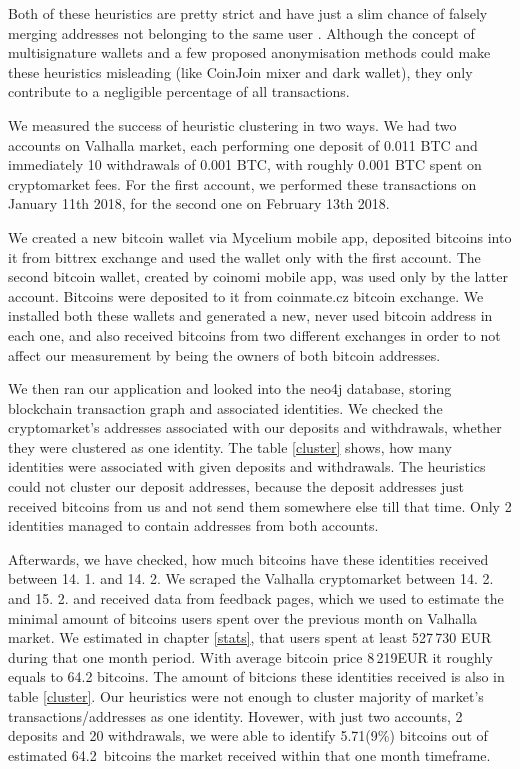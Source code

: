\documentclass[
  digital, %
  table,   %
  lof,     %
  lot,     %
  oneside
]{fithesis3}
\begin{document}
Both of these heuristics are pretty strict and have just a slim chance of falsely merging
addresses not belonging to the same user \parencite{androulaki2013evaluating}.
Although the concept of multisignature wallets and a few proposed anonymisation methods could make
these heuristics misleading (like CoinJoin mixer and dark wallet), they only contribute to a 
negligible percentage of all transactions.

We measured the success of heuristic clustering in two ways.
We had two accounts on Valhalla market, each performing one deposit of 0.011 BTC and immediately 10 withdrawals of
0.001 BTC, with roughly 0.001 BTC spent on cryptomarket fees.
For the first account, we performed these transactions on January 11th 2018, for the second one on February 13th 2018.

We created a new bitcoin wallet via Mycelium mobile app, deposited bitcoins into it
from bittrex exchange and used the wallet only with the first account.
The second bitcoin wallet, created by coinomi mobile app, was used only by the latter account. 
Bitcoins were deposited to it from coinmate.cz bitcoin exchange.
We installed both these wallets and generated a new, never used bitcoin address in each one, and also
received bitcoins from two different exchanges in order to not affect
our measurement by being the owners of both bitcoin addresses.

We then ran our application and looked into the neo4j database, storing
blockchain transaction graph and associated identities.
We checked the cryptomarket's addresses associated with our deposits and withdrawals,
whether they were clustered as one identity. The table \ref{cluster} shows, how many identities
were associated with given deposits and withdrawals. The heuristics could not cluster our
deposit addresses, because the deposit addresses just received bitcoins from us and not send them
somewhere else till that time. Only 2 identities managed to contain addresses from both accounts.

Afterwards, we have checked, how much bitcoins have these
identities received between 14. 1. and 14. 2. We scraped the Valhalla cryptomarket between 14. 2. and 15. 2.
and received data from feedback pages, which we used to estimate 
the minimal amount of bitcoins users spent over the previous month on Valhalla market.
We estimated in chapter \ref{stats}, that users spent at least 527\,730 EUR during that one month period.
With average bitcoin price 8\,219EUR it roughly equals to 64.2 bitcoins.
The amount of bitcions these identities received is also in table \ref{cluster}.
Our heuristics were not enough to cluster majority of market's transactions/addresses as one identity.
Hovewer, with just two accounts, 2 deposits and 20 withdrawals, we were able to identify 5.71(9\%) bitcoins out of estimated
64.2~bitcoins the market received within that one month timeframe.
\end{document}

